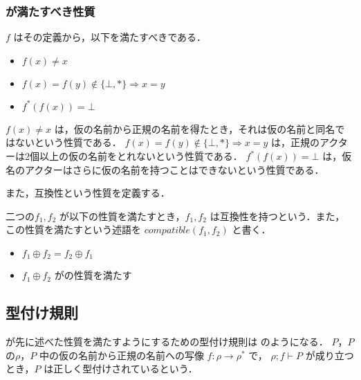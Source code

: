 \subsubsection{\tmp が満たすべき性質}

\tmp $f$ はその定義から，以下を満たすべきである．

\begin{itemize}
  \item $ f(x) \neq x $
  \item $ f(x) = f(y) \notin \{\bot,\ast\} \Rightarrow x = y $
  \item $ f^{*}(f(x)) = \bot $
\end{itemize}

$ f(x) \neq x $ は，仮の名前から正規の名前を得たとき，それは仮の名前と同名ではないという性質である．
$ f(x) = f(y) \notin \{\bot,\ast\} \Rightarrow x = y $ は，正規のアクターは2個以上の仮の名前をとれないという性質である．
$ f^{*}(f(x)) = \bot $ は，仮名のアクターはさらに仮の名前を持つことはできないという性質である．

また，互換性という性質を定義する．

\begin{dfn}
  二つの\tmp $f_1, f_2$ が以下の性質を満たすとき，$f_1,f_2$ は互換性を持つという．また，この性質を満たすという述語を $compatible(f_1,f_2)$ と書く．
  \begin{itemize}
    \item $f_1 \oplus f_2 = f_2 \oplus f_1$
    \item $f_1 \oplus f_2$ が\tmp の性質を満たす
  \end{itemize}
\end{dfn}

\subsection{型付け規則}

\label{typing_rule}

\api が先に述べた性質を満たすようにするための型付け規則は のようになる．
\conf $ P $，$ P $ の\recep $ \rho $，$ P $ 中の仮の名前から正規の名前への写像 $f : \rho \rightarrow \rho^*$ で， $\rho ; f \vdash P$ が成り立つとき，$ P $ は正しく型付けされているという．

